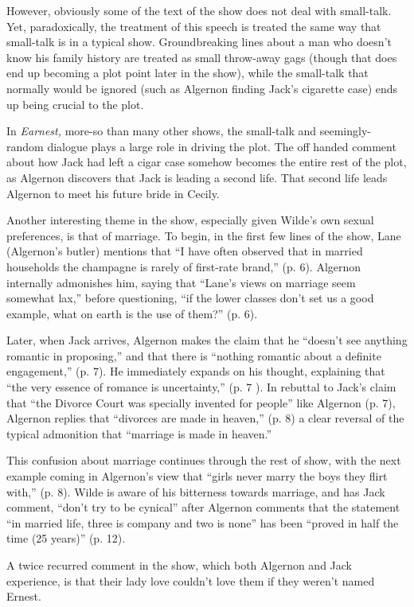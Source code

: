 \documentclass[12pt]{article}[titlepage]
\newcommand{\say}[1]{``#1''}
\newcommand{\1}{\={a}}
\newcommand{\2}{\={e}}
\newcommand{\3}{\={\i}}
\newcommand{\4}{\=o}
\newcommand{\5}{\=u}
\newcommand{\6}{\={A}}
\renewcommand{\,}{\textsuperscript{,}}
\begin{document}
However, obviously some of the text of the show does not deal with small-talk.
Yet, paradoxically, the treatment of this speech is treated the same way that small-talk is in a typical show.
Groundbreaking lines about a man who doesn't know his family history are treated as small throw-away gags (though that does end up becoming a plot point later in the show), while the small-talk that normally would be ignored (such as Algernon finding Jack's cigarette case) ends up being crucial to the plot.

In \textit{Earnest,} more-so than many other shows, the small-talk and seemingly-random dialogue plays a large role in driving the plot.
The off handed comment about how Jack had left a cigar case somehow becomes the entire rest of the plot, as Algernon discovers that Jack is leading a second life.
That second life leads Algernon to meet his future bride in Cecily.

Another interesting theme in the show, especially given Wilde's own sexual preferences, is that of marriage.
To begin, in the first few lines of the show, Lane (Algernon's butler) mentions that \say{I have often observed that in married households the champagne is rarely of first-rate brand,} (p. 6).
Algernon internally admonishes him, saying that \say{Lane's views on marriage seem somewhat lax,} before questioning, \say{if the lower classes don't set us a good example, what on earth is the use of them?} (p. 6).

Later, when Jack arrives, Algernon makes the claim that he \say{doesn't see anything romantic in proposing,} and that there is \say{nothing romantic about a definite engagement,} (p. 7).
He immediately expands on his thought, explaining that \say{the very essence of romance is uncertainty,} (p. 7 ).
In rebuttal to Jack's claim that \say{the Divorce Court was specially invented for people} like Algernon (p. 7), Algernon replies that \say{divorces are made in heaven,} (p. 8) a clear reversal of the typical admonition that \say{marriage is made in heaven.}

This confusion about marriage continues through the rest of show, with the next example coming in Algernon's view that \say{girls never marry the boys they flirt with,} (p. 8).
Wilde is aware of his bitterness towards marriage, and has Jack comment, \say{don't try to be cynical} after Algernon comments that the statement \say{in married life, three is company and two is none} has been \say{proved in half the time (25 years)} (p. 12).

A twice recurred comment in the show, which both Algernon and Jack experience, is that their lady love couldn't love them if they weren't named Ernest.
\end{document}
